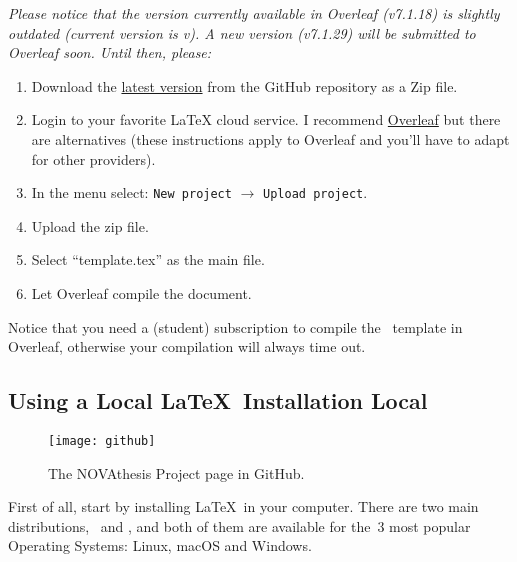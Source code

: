 \bgroup
  \itshape
  Please notice that the version currently available in Overleaf (v7.1.18) is slightly outdated (current version is v\novathesisversion). A new version (v7.1.29) will be submitted to Overleaf soon.  Until then, please:
  \begin{enumerate}
    \item Download the \href{https://github.com/joaomlourenco/novathesis/archive/main.zip}{latest version} from the GitHub repository as a Zip file.
    \item Login to your favorite LaTeX cloud service. I recommend \href{https://www.overleaf.com/?r=f5160636&rm=d&rs=b}{Overleaf} but there are alternatives (these instructions apply to Overleaf and you'll have to adapt for other providers).
    \item In the menu select: \texttt{New project} $\rightarrow$ \texttt{Upload project}.
    \item Upload the zip file.
    \item Select “template.tex” as the main file.
    \item Let Overleaf compile the document.
  \end{enumerate}
\egroup

\begin{tcolorbox}[colback=red!8]
	Notice that you need a (student) subscription to compile the \novathesis\ template in Overleaf, otherwise your compilation will always time out.
\end{tcolorbox}

\subsection{Using a Local \LaTeX\ Installation Local}
\label{sub:using_local_latex}


\begin{wrapfigure}{r}{0.3\linewidth}
\vspace*{-7ex}
\texttt{[image: github]}%
\caption{The NOVAthesis Project page in GitHub.}
\label{fig:github2}
\end{wrapfigure}

First of all, start by installing \LaTeX\ in your computer.  There are two main distributions, \href{https://miktex.org}{\ntindex{\MikTeX}}\ and \href{https://www.tug.org/texlive/}{\ntindex{\TeXLive}}, and both of them are available for the~3 most popular Operating Systems: Linux, macOS and Windows.

